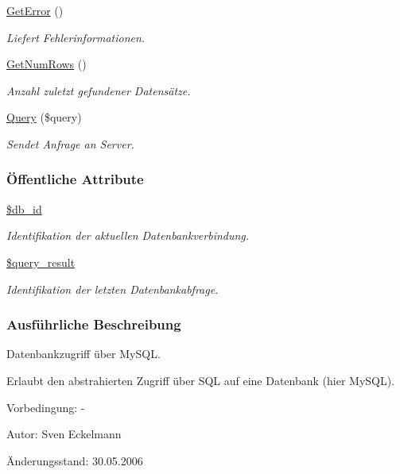 \begin{CompactItemize}
\hyperlink{classSQLDB_efc9afe11649d6cdae21575717ec3436}{Get\-Error} ()
\begin{CompactList}\small\item\em Liefert Fehlerinformationen. \item\end{CompactList}\item 
\hyperlink{classSQLDB_15b181251b309ab55331be29fa33ac9f}{Get\-Num\-Rows} ()
\begin{CompactList}\small\item\em Anzahl zuletzt gefundener Datensätze. \item\end{CompactList}\item 
\hyperlink{classSQLDB_fc6ffa8df50f68f07d9f5e3385b96d7a}{Query} (\$query)
\begin{CompactList}\small\item\em Sendet Anfrage an Server. \item\end{CompactList}\end{CompactItemize}
\subsubsection*{\"{O}ffentliche Attribute}
\begin{CompactItemize}
\item 
\hyperlink{classSQLDB_2c62843044a6ec53ad3384fb36aa811b}{\$db\_\-id}
\begin{CompactList}\small\item\em Identifikation der aktuellen Datenbankverbindung. \item\end{CompactList}\item 
\hyperlink{classSQLDB_879fa41a3df6664f4ce83960808326ab}{\$query\_\-result}
\begin{CompactList}\small\item\em Identifikation der letzten Datenbankabfrage. \item\end{CompactList}\end{CompactItemize}


\subsubsection{Ausf\"{u}hrliche Beschreibung}
Datenbankzugriff über My\-SQL. 

Erlaubt den abstrahierten Zugriff über SQL auf eine Datenbank (hier My\-SQL). \begin{Desc}
\item[Vorbedingung:]-\end{Desc}
\begin{Desc}
\item[Autor:]Sven Eckelmann \end{Desc}
\begin{Desc}
\item[Änderungsstand:]30.05.2006 \end{Desc}




